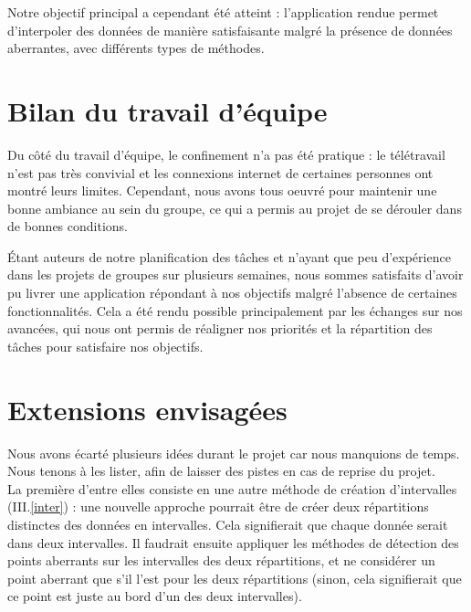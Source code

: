\documentclass[a4paper,12pt]{article} %
\begin{document}
    Notre objectif principal a cependant été atteint : l'application rendue permet d'interpoler des données de manière satisfaisante malgré la présence de données aberrantes, avec différents types de méthodes.
    
	\section{Bilan du travail d'équipe}
	Du côté du travail d'équipe, le confinement n'a pas été pratique : le télétravail n'est pas très convivial et les connexions internet de certaines personnes ont montré leurs limites. Cependant, nous avons tous oeuvré pour maintenir une bonne ambiance au sein du groupe, ce qui a permis au projet de se dérouler dans de bonnes conditions.
	
    Étant auteurs de notre planification des tâches et n'ayant que peu d'expérience dans les projets de groupes sur plusieurs semaines, nous sommes satisfaits d'avoir pu livrer une application répondant à nos objectifs malgré l'absence de certaines fonctionnalités. Cela a été rendu possible principalement par les échanges sur nos avancées, qui nous ont permis de réaligner nos priorités et la répartition des tâches pour satisfaire nos objectifs. 
    
    \section{Extensions envisagées}
    Nous avons écarté plusieurs idées durant le projet car nous manquions de temps. Nous tenons à les lister, afin de laisser des pistes en cas de reprise du projet.\\
    
    La première d'entre elles consiste en une autre méthode de création d'intervalles (III.\ref{inter}) : une nouvelle approche pourrait être de créer deux répartitions distinctes des données en intervalles. Cela signifierait que chaque donnée serait dans deux intervalles. Il faudrait ensuite appliquer les méthodes de détection des points aberrants sur les intervalles des deux répartitions, et ne considérer un point aberrant que s'il l'est pour les deux répartitions (sinon, cela signifierait que ce point est juste au bord d'un des deux intervalles).\\
    
\end{document}
